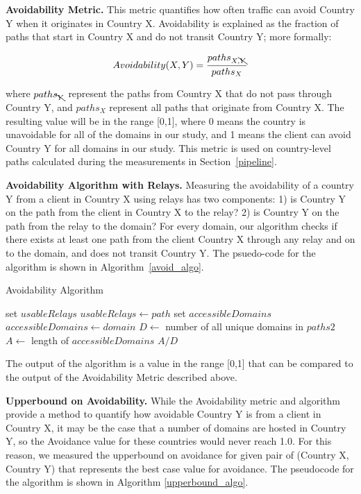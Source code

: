 {\bf Avoidability Metric.}  This metric quantifies how often traffic can avoid Country Y when it originates in Country X.  Avoidability is explained as the fraction of paths that start in Country X and do not transit Country Y; more formally:

\[Avoidability(X,Y) = \frac{paths_{X,\bcancel{Y}}}{paths_{X}}\]

where $paths_{\bcancel{Y}}$ represent the paths from Country X that do not pass through Country Y, and $paths_{X}$ represent all paths that originate from Country X. The resulting value will be in the range [0,1], where 0 means the country is unavoidable for all of the domains in our study, and 1 means the client can avoid Country Y for all domains in our study.  This metric is used on country-level paths calculated during the measurements in Section~\ref{pipeline}.

{\bf Avoidability Algorithm with Relays.}  Measuring the avoidability of a country Y from a client in Country X using relays has two components: 1) is Country Y on the path from the client in Country X to the relay?  2) is Country Y on the path from the relay to the domain?  For every domain, our algorithm checks if there exists at least one path from the client Country X through any relay and on to the domain, and does not transit Country Y.  The psuedo-code for the algorithm is shown in Algorithm~\ref{avoid_algo}.

\begin{algorithm}
\caption{Avoidability Algorithm}
\label{avoid_algo}
\begin{algorithmic}[1]
    \State set $usableRelays$
		\State $usableRelays \gets path$
	\EndIf
    \EndFor
    \State set $accessibleDomains$
        \State $accessibleDomains \gets domain$
        \EndIf
    \EndIf
    \EndFor
    \State $D \gets$ number of all unique domains in $paths2$
    \State $A \gets$ length of $accessibleDomains$
    \State \Return $A / D$
\EndFunction
\end{algorithmic}
\end{algorithm}

The output of the algorithm is a value in the range [0,1] that can be compared to the output of the Avoidability Metric described above.  

{\bf Upperbound on Avoidability.}  While the Avoidability metric and algorithm provide a method to quantify how avoidable Country Y is from a client in Country X, it may be the case that a number of domains are hosted in Country Y, so the Avoidance value for these countries would never reach 1.0.  For this reason, we measured the upperbound on avoidance for given pair of (Country X, Country Y) that represents the best case value for avoidance.  The pseudocode for the algorithm is shown in Algorithm \ref{upperbound_algo}.

